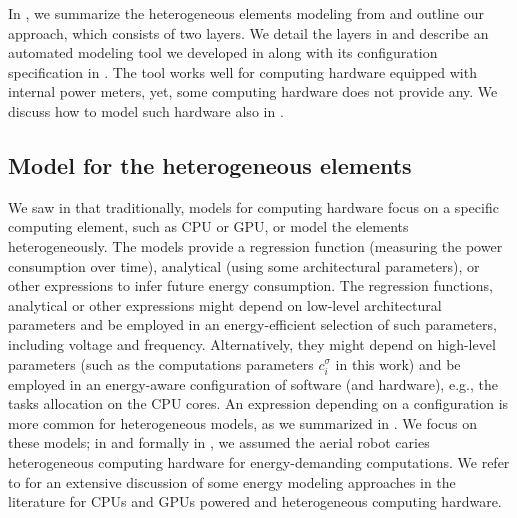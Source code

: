 In , we summarize the heterogeneous elements modeling from  and outline our approach, which consists of two layers. We detail the layers in  and describe an automated modeling tool we developed in  along with its configuration specification in . The tool works well for computing hardware equipped with internal power meters, yet, some computing hardware does not provide any. We discuss how to model such hardware also in .


\subsection{Model for the heterogeneous elements}
\label{sec:model-hete-elem}

We saw in  that traditionally, models for computing hardware focus on a specific computing element, such as CPU or GPU, or model the elements heterogeneously. The models provide a regression function (measuring the power consumption over time), analytical (using some architectural parameters), or other expressions to infer future energy consumption. The regression functions, analytical or other expressions might depend on low-level architectural parameters and be employed in an energy-efficient selection of such parameters, including voltage and frequency. Alternatively, they might depend on high-level parameters (such as the computations parameters $c_{i}^\sigma$ in this work) and be employed in an energy-aware configuration of software (and hardware), e.g., the tasks allocation on the CPU cores. An expression depending on a configuration is more common for heterogeneous models, as we summarized in . We focus on these models; in  and formally in , we assumed the aerial robot caries heterogeneous computing hardware for energy-demanding computations. We refer to  for an extensive discussion of some energy modeling approaches in the literature for CPUs and GPUs powered and heterogeneous computing hardware. 

